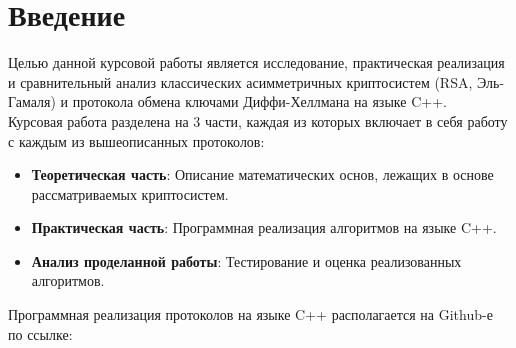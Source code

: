 \section{Введение}

Целью данной курсовой работы является исследование, практическая реализация и сравнительный анализ классических асимметричных криптосистем (RSA, Эль-Гамаля) и протокола обмена ключами Диффи-Хеллмана на языке C++.\\

\noindent Курсовая работа разделена на 3 части, каждая из которых включает в себя работу с каждым из вышеописанных протоколов:
\begin{itemize}
    \item \textbf{Теоретическая часть}: Описание математических основ, лежащих в основе рассматриваемых криптосистем.
    \item \textbf{Практическая часть}: Программная реализация алгоритмов на языке C++.
    \item \textbf{Анализ проделанной работы}: Тестирование и оценка реализованных алгоритмов.
\end{itemize}

\noindent Программная реализация протоколов на языке C++ располагается на Github-е по ссылке: 

